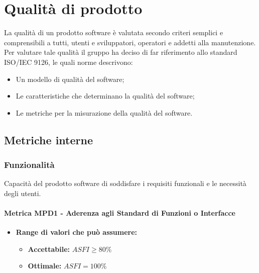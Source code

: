 \section{Qualità di prodotto}
La qualità di un prodotto software è valutata secondo criteri semplici e comprensibili a tutti, utenti e sviluppatori, operatori e addetti alla manutenzione.
Per valutare tale qualità il gruppo \Gruppo{} ha deciso di far riferimento allo standard ISO/IEC 9126, le quali norme descrivono:
\begin{itemize}
    \item Un modello di qualità del software; 
    \item Le caratteristiche che determinano la qualità del software;
    \item Le metriche per la misurazione della qualità del software.
\end{itemize}

\subsection{Metriche interne}

\subsubsection{Funzionalità}
Capacità del prodotto software di soddisfare i requisiti funzionali e le necessità degli utenti.
\paragraph{Metrica MPD1 - Aderenza agli Standard di Funzioni o Interfacce} 
\begin{itemize}
    \item \textbf{Range di valori che può assumere:}
    \begin{itemize}
        \item \textbf{Accettabile:} $ASFI \geq 80\% $
        \item \textbf{Ottimale:} $ASFI = 100\%$
    \end{itemize}
\end{itemize}
              
